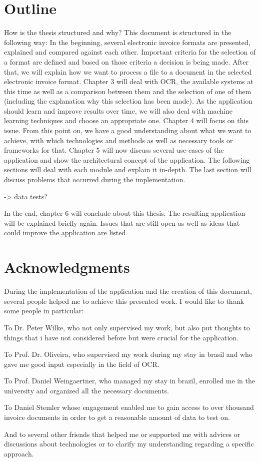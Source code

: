 
\section{Outline}

How is the thesis structured and why? %
This document is structured in the following way: In the beginning, several electronic invoice formats are presented, explained and compared against each other. Important criteria for the selection of a format are defined and based on those criteria a decision is being made.
After that, we will explain how we want to process a file to a document in the selected electronic invoice format. Chapter 3 will deal with OCR, the available systems at this time as well as a comparison between them and the selection of one of them (including the explanation why this selection has been made).
As the application should learn and improve results over time, we will also deal with machine learning techniques and choose an appropriate one. Chapter 4 will focus on this issue.
From this point on, we have a good understanding about what we want to achieve, with which technologies and methods as well as necessary tools or frameworks for that. Chapter 5 will now discuss several use-cases of the application and show the architectural concept of the application. The following sections will deal with each module and explain it in-depth. The last section will discuss problems that occurred during the implementation.

-> data tests?

In the end, chapter 6 will conclude about this thesis. The resulting application will be explained briefly again. Issues that are still open as well as ideas that could improve the application are listed.

\section{Acknowledgments}

During the implementation of the application and the creation of this document, several people helped me to achieve this presented work. I would like to thank some people in particular:

To Dr. Peter Wilke, who not only supervised my work, but also put thoughts to things that i have not considered before but were crucial for the application.

To Prof. Dr. Oliveira, who supervised my work during my stay in brasil and who gave me good input especially in the field of OCR.

To Prof. Daniel Weingaertner, who managed my stay in brazil, enrolled me in the university and organized all the necessary documents.

To Daniel Stemler whose engagement enabled me to gain access to over thousand invoice documents in order to get a reasonable amount of data to test on.

And to several other friends that helped me or supported me with advices or discussions about technologies or to clarify my understanding regarding a specific approach.